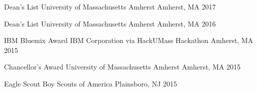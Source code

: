 




\begin{cvhonors}

    \cvhonor
      {Dean’s List}
      {University of Massachusetts Amherst}
      {Amherst, MA}
      {2017}
      
        \cvhonor
      {Dean’s List}
      {University of Massachusetts Amherst}
      {Amherst, MA}
      {2016}
      
     \cvhonor
    {IBM Bluemix Award} %
    {IBM Corporation via HackUMass Hackathon} %
    {Amherst, MA} %
    {2015} %
      
    \cvhonor
      {Chancellor's Award}
      {University of Massachusetts Amherst}
      {Amherst, MA}
      {2015}
      
    \cvhonor
    {Eagle Scout} %
    {Boy Scouts of America} %
    {Plainsboro, NJ} %
    {2015} %

\end{cvhonors}